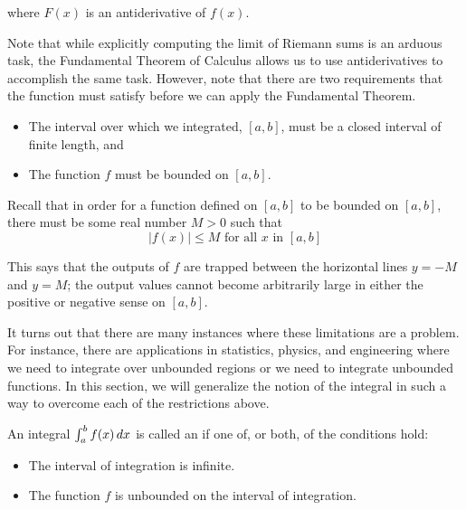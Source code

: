 \documentclass{ximera}
\begin{document}
where $F(x)$ is an antiderivative of $f(x)$.

Note that while explicitly computing the limit of Riemann sums is an arduous task, the Fundamental Theorem of Calculus allows us to use antiderivatives to accomplish the same task.  However, note that there are two requirements that the function must satisfy before we can apply the Fundamental Theorem.

\begin{itemize}
\item The interval over which we integrated, $[a,b]$, must be a closed interval of finite length, and
\item The function $f$ must be bounded on $[a,b]$.
\end{itemize}


\begin{remark}
Recall that in order for a function defined on $[a, b]$ to be bounded on $[a,b]$, there must be some real number $M>0$ such that
\[
|f(x)| \leq M \text{ for all } x \text{ in } [a, b]
\]

This says that the outputs of $f$ are trapped between the horizontal lines $y=-M$ and $y=M$; the output values cannot
become arbitrarily large in either the positive or negative sense on $[a,b]$.
\end{remark}


It turns out that there are many instances where these limitations are a problem.  For instance, there are applications in statistics, physics, and engineering where we need to integrate over unbounded regions or we need to integrate unbounded functions.  In this section, we will generalize the notion of the integral in such a way to overcome each of the restrictions above.



\begin{definition}
  An integral $\int_a^b f(x) \mathop{}\!d x $
  is called an  if one of, or both, of the conditions hold:
  \begin{itemize}
  \item The interval of integration is infinite.
  \item The function $f$ is unbounded on the interval of integration.
  \end{itemize}
\end{definition}
\end{document}
